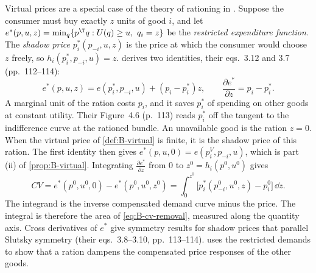 \begin{remark}\label{rem:B-rationing}
Virtual prices are a special case of the theory of rationing in \citet[Section~4.3,
pp.~109--114]{DeatonMuellbauer1980b}. Suppose the consumer must buy exactly $z$ units of good $i$, and let
$e^*(p, u, z) = \min_q\{p^\T q : U(q) \geq u,\ q_i = z\}$ be the \emph{restricted expenditure function}. The
\emph{shadow price} $p_i^*(p_{-i}, u, z)$ is the price at which the consumer would choose $z$ freely, so
$h_i(p_i^*, p_{-i}, u) = z$.  derives two identities, their eqs.~3.12 and 3.7
(pp.~112--114):
\begin{equation*}
e^*(p, u, z) = e(p_i^*, p_{-i}, u) + (p_i - p_i^*)z,
\qquad
\frac{\partial e^*}{\partial z} = p_i - p_i^* .
\end{equation*}
A marginal unit of the ration costs $p_i$, and it saves $p_i^*$ of spending on other goods at constant
utility. Their Figure~4.6 (p.~113) reads $p_i^*$ off the tangent to the indifference curve at the rationed
bundle. An unavailable good is the ration $z = 0$. When the virtual price of \cref{def:B-virtual} is finite, it
is the shadow price of this ration. The first identity then gives $e^*(p, u, 0) = e(p_i^V, p_{-i}, u)$, which is
part (ii) of \cref{prop:B-virtual}. Integrating $\frac{\partial e^*}{\partial z}$ from $0$ to $z^0 = h_i(p^0, u^0)$
gives
\begin{equation*}
CV = e^*(p^0, u^0, 0) - e^*(p^0, u^0, z^0) = \int_0^{z^0}\big[p_i^*(p_{-i}^0, u^0, z) - p_i^0\big]\,\dd z .
\end{equation*}
The integrand is the inverse compensated demand curve minus the price. The integral is therefore the area
of \eqref{eq:B-cv-removal}, measured along the quantity axis. Cross derivatives of $e^*$ give symmetry
results for shadow prices that parallel Slutsky symmetry (their eqs.~3.8--3.10, pp.~113--114).
 uses the restricted demands to show that a ration dampens the compensated
price responses of the other goods.
\end{remark}

